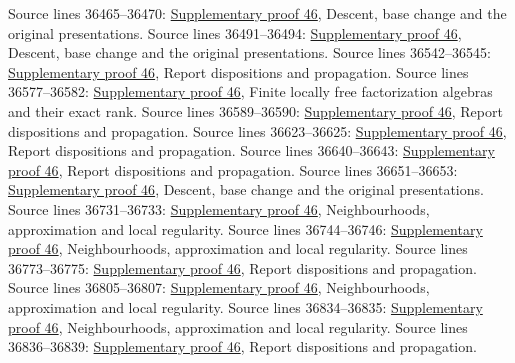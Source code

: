 \begin{AlgebraSourceRoutes}
 Source lines 36465--36470: \hyperlink{algebra_syntomic_notes_20260928}{Supplementary proof 46}, Descent, base change and the original presentations.
 Source lines 36491--36494: \hyperlink{algebra_syntomic_notes_20260928}{Supplementary proof 46}, Descent, base change and the original presentations.
 Source lines 36542--36545: \hyperlink{algebra_syntomic_notes_20260928}{Supplementary proof 46}, Report dispositions and propagation.
 Source lines 36577--36582: \hyperlink{algebra_syntomic_notes_20260928}{Supplementary proof 46}, Finite locally free factorization algebras and their exact rank.
 Source lines 36589--36590: \hyperlink{algebra_syntomic_notes_20260928}{Supplementary proof 46}, Report dispositions and propagation.
 Source lines 36623--36625: \hyperlink{algebra_syntomic_notes_20260928}{Supplementary proof 46}, Report dispositions and propagation.
 Source lines 36640--36643: \hyperlink{algebra_syntomic_notes_20260928}{Supplementary proof 46}, Report dispositions and propagation.
 Source lines 36651--36653: \hyperlink{algebra_syntomic_notes_20260928}{Supplementary proof 46}, Descent, base change and the original presentations.
 Source lines 36731--36733: \hyperlink{algebra_syntomic_notes_20260928}{Supplementary proof 46}, Neighbourhoods, approximation and local regularity.
 Source lines 36744--36746: \hyperlink{algebra_syntomic_notes_20260928}{Supplementary proof 46}, Neighbourhoods, approximation and local regularity.
 Source lines 36773--36775: \hyperlink{algebra_syntomic_notes_20260928}{Supplementary proof 46}, Report dispositions and propagation.
 Source lines 36805--36807: \hyperlink{algebra_syntomic_notes_20260928}{Supplementary proof 46}, Neighbourhoods, approximation and local regularity.
 Source lines 36834--36835: \hyperlink{algebra_syntomic_notes_20260928}{Supplementary proof 46}, Neighbourhoods, approximation and local regularity.
 Source lines 36836--36839: \hyperlink{algebra_syntomic_notes_20260928}{Supplementary proof 46}, Report dispositions and propagation.

\end{AlgebraSourceRoutes}
